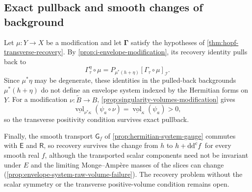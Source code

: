 \subsection{Exact pullback and smooth changes of background}

Let $\mu\colon Y\to X$ be a modification and let $\boldsymbol\Gamma$ satisfy the hypotheses of \cref{thm:hopf-transverse-recovery}. By \cref{prop:i-envelope-modification}, its recovery identity pulls back to
\[
 \Gamma_\tau^\eta\circ\mu
       =P_{\mu^*(h+\eta)}[\Gamma_\tau\circ\mu]_{\mathcal I}.
\]
Since $\mu^*\eta$ may be degenerate, these identities in the pulled-back backgrounds $\mu^*(h+\eta)$ do not define an envelope system indexed by the Hermitian forms on $Y$. For a modification $\nu\colon\widetilde B\to B$, \cref{prop:singularity-volumes-modification} gives
\[
 \underline{\operatorname{vol}}_{\nu^*\kappa}
                  (\psi_a\circ\nu)
       =\underline{\operatorname{vol}}_\kappa(\psi_a)>0,
\]
so the transverse positivity condition survives exact pullback.

Finally, the smooth transport $\mathsf G_f$ of \cref{prop:hermitian-system-gauge} commutes with $\mathsf E$ and $\mathsf R$, so recovery survives the change from $h$ to $h+\mathrm{dd}^{\mathrm{c}} f$ for every smooth real $f$, although the transported scalar components need not be invariant under $E$ and the limiting Monge--Amp\`ere masses of the slices can change (\cref{prop:envelope-system-raw-volume-failure}). The recovery problem without the scalar symmetry or the transverse positive-volume condition remains open.
